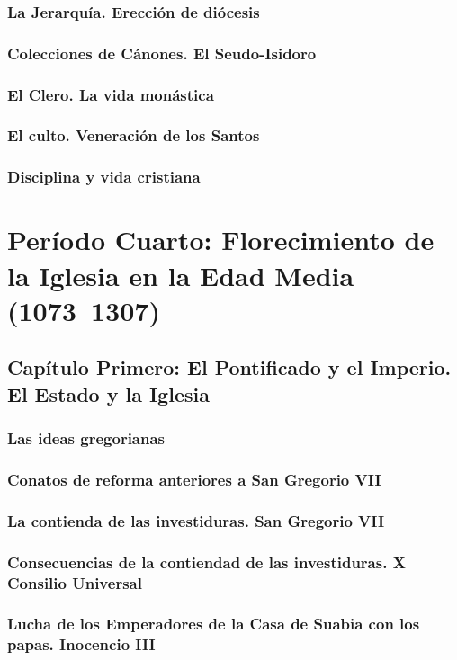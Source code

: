 \raggedbottom{} \documentclass[12pt]{book}
\begin{document}
\section{La Jerarquía. Erección de diócesis}
\section{Colecciones de Cánones. El Seudo-Isidoro}
\section{El Clero. La vida monástica}
\section{El culto. Veneración de los Santos}
\section{Disciplina y vida cristiana}
\part{Período Cuarto: Florecimiento de la Iglesia en la Edad Media (1073~1307)}
\chapter{Capítulo Primero: El Pontificado y el Imperio. El Estado y la Iglesia}
\section{Las ideas gregorianas}
\section{Conatos de reforma anteriores a San Gregorio VII}
\section{La contienda de las investiduras. San Gregorio VII}
\section{Consecuencias de la contiendad de las investiduras. X Consilio Universal}
\section{Lucha de los Emperadores de la Casa de Suabia con los papas. Inocencio III}
\end{document}
